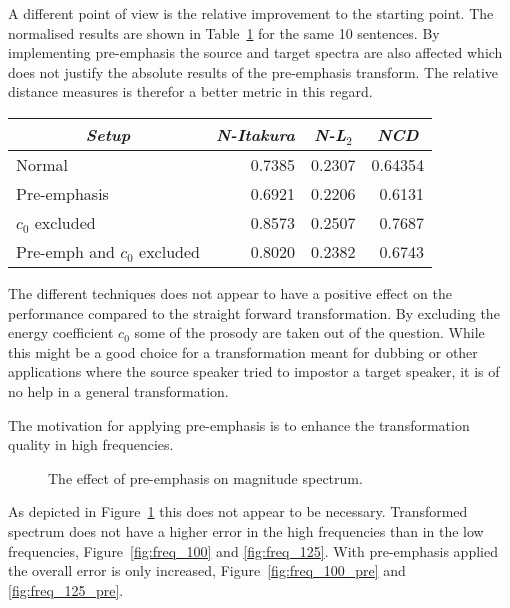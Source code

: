 A different point of view is the relative improvement to the starting point. The normalised results are shown in Table~\ref{tab:normalised_freq_results} for the same 10 sentences. By implementing pre-emphasis the source and target spectra are also affected which does not justify the absolute results of the pre-emphasis transform. The relative distance measures is therefor a better metric in this regard.
\begin{table}[htbp]
	\begin{center}
		\label{tab:normalised_freq_results}
		\begin{tabular}{lrrr}
			\toprule
			\multicolumn{1}{c}{\emph{Setup}} & \multicolumn{1}{c}{\emph{N-Itakura}} & \multicolumn{1}{c}{\emph{N-L$_2$}} & \multicolumn{1}{c}{\emph{NCD}}\\
			\midrule
			Normal & 0.7385 & 0.2307 & 0.64354 \\
			Pre-emphasis &  0.6921 & 0.2206 & 0.6131 \\
			$c_0$ excluded & 0.8573 & 0.2507 & 0.7687 \\
			Pre-emph and $c_0$ excluded & 0.8020 & 0.2382 & 0.6743 \\
			\bottomrule			
		\end{tabular}		
	\end{center}	
\end{table}
The different techniques does not appear to have a positive effect on the performance compared to the straight forward transformation. By excluding the energy coefficient $c_0$ some of the prosody are taken out of the question. While this might be a good choice for a transformation meant for dubbing or other applications where the source speaker tried to impostor a target speaker, it is of no help in a general transformation.

The motivation for applying pre-emphasis is to enhance the transformation quality in high frequencies.
\begin{figure}[htbp]
	\begin{center}
	\caption{The effect of pre-emphasis on magnitude spectrum.}
	\label{fig:pre_emphasis_magnitude_spectrum}
	\end{center}
\end{figure}
As depicted in Figure~\ref{fig:pre_emphasis_magnitude_spectrum} this does not appear to be necessary. Transformed spectrum does not have a higher error in the high frequencies than in the low frequencies, Figure~\ref{fig:freq_100} and \ref{fig:freq_125}. With pre-emphasis applied the overall error is only increased, Figure~\ref{fig:freq_100_pre} and \ref{fig:freq_125_pre}.

